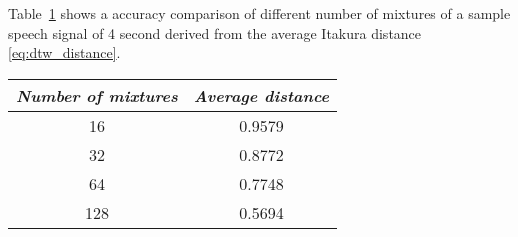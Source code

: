 \clearpage
Table~\ref{tab:accuracy_comparison} shows a accuracy comparison of different number of mixtures of a sample speech signal of 4 second derived from the average Itakura distance \eqref{eq:dtw_distance}.
\begin{table}[ht]
	\begin{center}
		\begin{tabular}{cc}
			\toprule
			\multicolumn{1}{c}{\emph{Number of mixtures}} & \multicolumn{1}{c}{\emph{Average distance}}\\
			\midrule
			16 & 0.9579 \\
			32 & 0.8772 \\
			64 & 0.7748 \\
			128 & 0.5694 \\
			\bottomrule			
		\end{tabular}		
	\end{center}
\label{tab:accuracy_comparison}	
\end{table}

